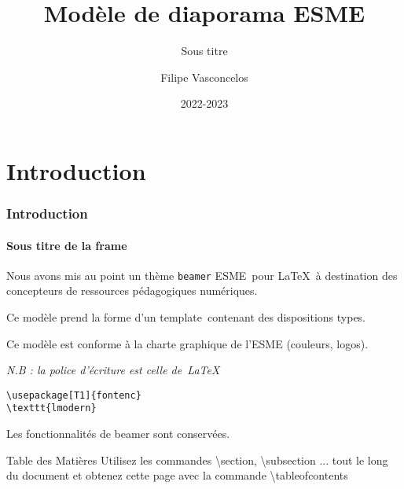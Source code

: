\documentclass[t,aspectratio=169]{beamer}
\title{Modèle de diaporama ESME}
\subtitle{Sous titre}
\author{Filipe Vasconcelos\inst{1}}
\institute{
    \inst{1} ESME Sudria, Lille, \textcolor{blue}{\texttt{filipe.vasconcelo@esme.fr}}
}
\date{2022-2023}
\begin{document}
\begin{frame}
\titlepage
\end{frame}

\section{Introduction}

\begin{frame}[fragile] 
\frametitle{Introduction} 
\framesubtitle{Sous titre de la frame} 

Nous avons mis au point un thème \texttt{beamer} \og ESME\fg~pour 
\LaTeX~à destination des concepteurs de ressources pédagogiques 
numériques.\newline

Ce modèle prend la forme d'un \og template\fg~contenant des 
dispositions types.\newline

Ce modèle est conforme à la charte graphique de l'ESME (couleurs, 
logos).

\emph{N.B : la police d'écriture est celle de~\LaTeX}\newline

\begin{verbatim}
\usepackage[T1]{fontenc}
\texttt{lmodern}
\end{verbatim}

Les fonctionnalités de beamer sont conservées.
\end{frame}

\begin{frame}{Table des Matières}
    \tableofcontents
    \scriptsize
    Utilisez les commandes \textbackslash section, \textbackslash subsection ...
    tout le long du document et obtenez cette page avec la commande 
    \textbackslash tableofcontents
\end{frame}
\end{document}
